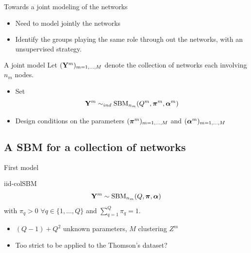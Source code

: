 \documentclass[compress,10pt]{beamer}
\begin{document}
\begin{frame}{Towards a joint modeling of the networks}
 
 
 \begin{itemize}
  \item Need to model jointly the networks
  \item Identify the groups playing the same role through out the networks, with an unsupervised strategy.  
 \end{itemize}
 
 
\begin{block}{A joint model}
 Let $(\mathbf{Y}^m)_{m=1,\dots,M}$ denote the collection of networks each involving $n_m$ nodes. 
 \begin{itemize}
  \item Set $$\mathbf{Y}^m \sim_{ind} \mbox{SBM}_{n_m}(Q^m, \boldsymbol{\pi}^m, \boldsymbol{\alpha}^m)$$
  \item Design conditions on the parameters $(\boldsymbol{\pi}^m)_{m=1,\dots,M}$ and $(\boldsymbol{\alpha}^m)_{m=1,\dots,M}$
 \end{itemize}
\end{block}

 \end{frame}
 



\subsection{A SBM for a collection of networks}
 
\begin{frame}{First model}

\begin{block}{iid-colSBM}
 \begin{equation*}\label{mod:iid}
\mathbf{Y}^m \sim \mbox{SBM}_{n_m}(Q,\boldsymbol{\pi}, \boldsymbol{\alpha})
\end{equation*}
with $\pi_{q} >0 $ $\forall q  \in  \{1,\dots, Q\}$ and $\sum_{q  = 1}^Q \pi_{q} = 1$.
\end{block}
\begin{itemize}
\item  $(Q-1)+Q^2$ unknown parameters, $M$ clustering $Z^{m}$
\item  Too strict to be applied to the Thomson's dataset? 
\end{itemize}


\end{frame}
\end{document}
